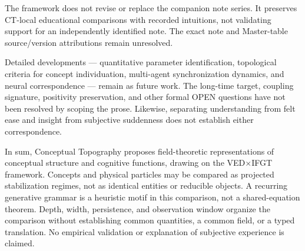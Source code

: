The framework does not revise or replace the companion note series.
It preserves CT-local educational comparisons with recorded intuitions,
not validating support for an independently identified note. The exact
note and Master-table source/version attributions remain unresolved.

Detailed developments --- quantitative parameter identification,
topological criteria for concept individuation, multi-agent
synchronization dynamics, and neural correspondence --- remain as
future work. The long-time target, coupling signature, positivity
preservation, and other formal OPEN questions have not been resolved by
scoping the prose. Likewise, separating understanding from felt ease and
insight from subjective suddenness does not establish either correspondence.

In sum, Conceptual Topography proposes field-theoretic representations
of conceptual structure and cognitive functions, drawing on the
VED$\times$IFGT framework.
Concepts and physical particles may be compared as projected stabilization
regimes, not as identical entities or reducible objects.
A recurring generative grammar is a heuristic motif in this comparison,
not a shared-equation theorem. Depth, width, persistence, and observation
window organize the comparison without establishing common quantities,
a common field, or a typed translation. No empirical validation or
explanation of subjective experience is claimed.
